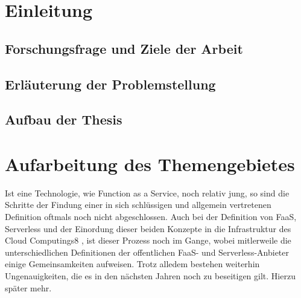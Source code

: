\documentclass[11pt]{article}
\begin{document}
\section{Einleitung}
\subsection{Forschungsfrage und Ziele der Arbeit}
\subsection{Erläuterung der Problemstellung}
\subsection{Aufbau der Thesis}










\section{Aufarbeitung des Themengebietes}
Ist eine Technologie, wie Function as a Service, noch relativ jung, so sind die Schritte der Findung einer in sich schlüssigen und allgemein vertretenen Definition oftmals noch nicht abgeschlossen. Auch bei der Definition von FaaS, Serverless und der Einordung dieser beiden Konzepte in die Infrastruktur des Cloud Computings8  \cite{mell2011nist}, ist dieser Prozess noch im Gange, wobei mitlerweile die unterschiedlichen Definitionen der offentlichen FaaS- und Serverless-Anbieter einige Gemeinsamkeiten aufweisen. Trotz alledem bestehen weiterhin Ungenauigkeiten, die es in den nächsten Jahren noch zu beseitigen gilt. Hierzu später mehr.\\\\
\end{document}
